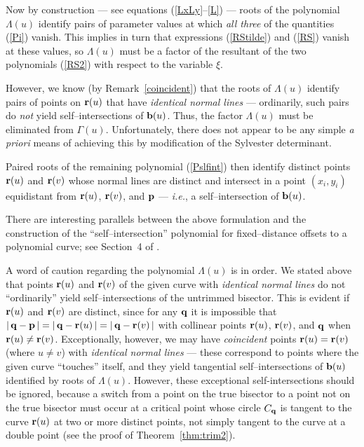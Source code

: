 Now by construction --- see equations (\ref{LxLy}--\ref{L}) --- roots
of the polynomial $\Lambda(u)$ identify pairs of parameter values at
which {\it all three\/} of the quantities (\ref{Pi}) vanish. This
implies in turn that expressions (\ref{RStilde}) and (\ref{RS}) vanish
at these values, so $\Lambda(u)$ must be a factor of the resultant
of the two polynomials (\ref{RS2}) with respect to the variable $\xi$.

However, we know (by Remark~\ref{coincident}) that the roots of
$\Lambda(u)$ identify pairs of points on ${\bf r}(u)$ that have {\it
identical normal lines\/} --- ordinarily, such pairs do {\it not\/}
yield self--intersections of ${\bf b}(u)$. Thus, the factor $\Lambda(u)$
must be eliminated from $\Gamma(u)$. Unfortunately, there does not appear
to be any simple {\it a priori\/} means of achieving this by modification
of the Sylvester determinant.

Paired roots of the remaining polynomial (\ref{Pslfint}) then identify
distinct points ${\bf r}(u)$ and ${\bf r}(v)$ whose normal lines are
distinct and intersect in a point $(x_i,y_i)$ equidistant from ${\bf r}
(u)$, ${\bf r}(v)$, and ${\bf p}$ --- {\it i.e.}, a self--intersection
of ${\bf b}(u)$. \QED

There are interesting parallels between the above formulation and the
construction of the ``self--intersection'' polynomial for fixed--distance
offsets to a polynomial curve; see Section~4 of \cite{farouki90b}.

\begin{rmk}
{\rm
A word of caution regarding the polynomial $\Lambda(u)$ is in order.
We stated above that points ${\bf r}(u)$ and ${\bf r}(v)$ of the
given curve with {\it identical normal lines\/} do not ``ordinarily''
yield self--intersections of the untrimmed bisector. This is evident
if ${\bf r}(u)$ and ${\bf r}(v)$ are distinct, since for any ${\bf q}$
it is impossible that $|\,{\bf q}-{\bf p}\,|=|\,{\bf q}-{\bf r}(u)\,|=
|\,{\bf q}-{\bf r}(v)\,|$ with collinear points ${\bf r}(u)$, ${\bf r}
(v)$, and ${\bf q}$ when ${\bf r}(u)\not={\bf r}(v)$. Exceptionally,
however, we may have {\it coincident\/} points ${\bf r}(u)={\bf r}
(v)$ (where $u\not=v$) with {\it identical normal lines\/} --- these
correspond to points where the given curve ``touches'' itself, and
they yield tangential self--intersections of ${\bf b}(u)$ identified
by roots of $\Lambda(u)$.
However, these exceptional self-intersections should be ignored,
because a switch from a point on the true bisector to a point not 
on the true bisector 
must occur at a critical point whose circle $C_{\bf q}$ is tangent
to the curve ${\bf r}(u)$ at two or more distinct points,
not simply tangent to the curve at a double point 
(see the proof of Theorem~\ref{thm:trim2}).
}
\end{rmk}


